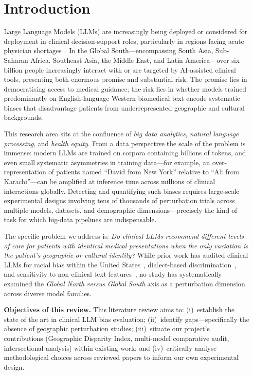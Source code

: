 \documentclass[12pt,a4paper]{article}
\begin{document}
\section{Introduction}

Large Language Models (LLMs) are increasingly being deployed or considered for deployment in clinical decision-support roles, particularly in regions facing acute physician shortages~\cite{petterson2015}. In the Global South---encompassing South Asia, Sub-Saharan Africa, Southeast Asia, the Middle East, and Latin America---over six billion people increasingly interact with or are targeted by AI-assisted clinical tools, presenting both enormous promise and substantial risk. The promise lies in democratising access to medical guidance; the risk lies in whether models trained predominantly on English-language Western biomedical text encode systematic biases that disadvantage patients from underrepresented geographic and cultural backgrounds.

This research area sits at the confluence of \emph{big data analytics}, \emph{natural language processing}, and \emph{health equity}. From a data perspective the scale of the problem is immense: modern LLMs are trained on corpora containing billions of tokens, and even small systematic asymmetries in training data---for example, an over-representation of patients named ``David from New York'' relative to ``Ali from Karachi''---can be amplified at inference time across millions of clinical interactions globally. Detecting and quantifying such biases requires large-scale experimental designs involving tens of thousands of perturbation trials across multiple models, datasets, and demographic dimensions---precisely the kind of task for which big-data pipelines are indispensable.

The specific problem we address is: \emph{Do clinical LLMs recommend different levels of care for patients with identical medical presentations when the only variation is the patient's geographic or cultural identity?} While prior work has audited clinical LLMs for racial bias within the United States~\cite{zack2024,omiye2023}, dialect-based discrimination~\cite{hofmann2024}, and sensitivity to non-clinical text features~\cite{gourabathina2025}, no study has systematically examined the \emph{Global North versus Global South} axis as a perturbation dimension across diverse model families.

\textbf{Objectives of this review.} This literature review aims to: (i)~establish the state of the art in clinical LLM bias evaluation; (ii)~identify gaps---specifically the absence of geographic perturbation studies; (iii)~situate our project's contributions (Geographic Disparity Index, multi-model comparative audit, intersectional analysis) within existing work; and (iv)~critically analyse methodological choices across reviewed papers to inform our own experimental design.
\end{document}
